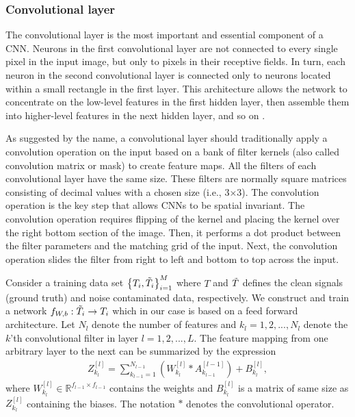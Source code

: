 \documentclass[a4paper]{article}
\begin{document}
\subsubsection{Convolutional layer}

The convolutional layer is the most important and essential component of a CNN. Neurons in the first convolutional layer are not connected to every single pixel in the input image, but only to pixels in their receptive fields. In turn, each neuron in the second convolutional layer is connected only to neurons located within a small rectangle in the first layer. This architecture allows the network to concentrate on the low-level features in the first hidden layer, then assemble them into higher-level features in the next hidden layer, and so on \cite{Hands-On}. 

As suggested by the name, a convolutional layer should traditionally apply a convolution operation on the input based on a bank of filter kernels (also called convolution matrix or mask) to create feature maps. All the filters of each convolutional layer have the same size. These filters are normally square matrices consisting of decimal values with a chosen size (i.e., 3$\times$3). The convolution operation is the key step that allows CNNs to be spatial invariant. The convolution operation requires flipping of the kernel and placing the kernel over the right bottom section of the image. Then, it performs a dot product between the filter parameters and the matching grid of the input. Next, the convolution operation slides the filter from right to left and bottom to top across the input.  

Consider a training data set $\left\{T_{i}, \Tilde{T}_{i}\right\}_{i=1}^{M}$  where $T$ and $\Tilde{T}$ defines the clean signals (ground truth) and noise contaminated data, respectively. We construct and train a network $f_{W,b}:\Tilde{T}_{i} \to T_{i}$ which in our case is based on a feed forward architecture. Let $N_{l}$ denote the number of features and $k_{l}=1,2,...,N_{l}$ denote the $k$’th convolutional filter in layer $l=1,2,...,L$. The feature mapping from one arbitrary layer to the next can be summarized by the expression
\begin{align}
    Z_{k_{l}}^{[l]} =
    \sum_{k_{l-1}=1}^{N_{l-1}} (W_{k_{l}}^{[l]} \ast A_{k_{l-1}}^{[l-1]})
    + B_{k_{l}}^{[l]},
    \label{conv}
\end{align}
where $W_{k_{l}}^{[l]}\in \mathbb{R}^{f_{l-1} \times f_{l-1}}$ contains the weights and $B_{k_{l}}^{[l]}$ is a matrix of same size as $Z_{k_{l}}^{[l]}$ containing the biases. The notation $\ast$ denotes the convolutional operator. 
\end{document}
